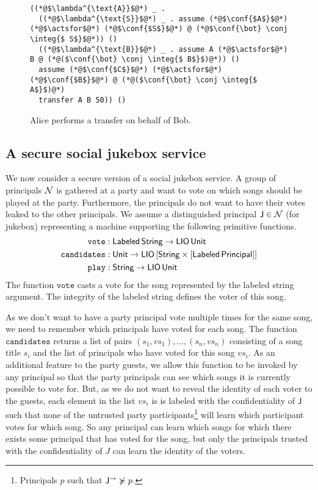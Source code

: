 \begin{figure}
\centering
\begin{lstlisting}
((*@$\lambda^{\text{A}}$@*) _ .
  ((*@$\lambda^{\text{S}}$@*) _ . assume (*@$\conf{$A$}$@*) (*@$\actsfor$@*) (*@$\conf{$S$}$@*) @ (*@$\conf{\bot} \conj \integ{$ S$}$@*)) ()
  ((*@$\lambda^{\text{B}}$@*) _ . assume A (*@$\actsfor$@*) B @ (*@($\conf{\bot} \conj \integ{$ B$}$)@*)) ()
  assume (*@$\conf{$C$}$@*) (*@$\actsfor$@*) (*@$\conf{$B$}$@*) @ (*@($\conf{\bot} \conj \integ{$ A$}$)@*)
  transfer A B 50)) ()
\end{lstlisting}
\caption{Alice performs a transfer on behalf of Bob.}
\label{fig:sec-bank-alice-banks-for-bob}
\end{figure}

\subsection{A secure social jukebox service}
We now consider a secure version of a social jukebox service. A group of principals $\mathcal{N}$ is gathered at a party and want to vote on which songs should be played at the party. Furthermore, the principals do not want to have their votes leaked to the other principals. We assume a distinguished principal $\mathsf{J} \in \mathcal{N}$ (for jukebox) representing a machine supporting the following primitive functions.
\begin{align*}
\mathtt{vote}&: \mathsf{Labeled}\,\mathsf{String} \to \mathsf{LIO}\,\mathsf{Unit}\\
\mathtt{candidates}&: \mathsf{Unit} \to \mathsf{LIO}\,\lbrack\mathsf{String} \times \lbrack\mathsf{Labeled}\,\mathsf{Principal}\rbrack\rbrack\\
\mathtt{play}&: \mathsf{String} \to \mathsf{LIO}\,\mathsf{Unit}
\end{align*}
The function $\mathtt{vote}$ casts a vote for the song represented by the labeled string argument. The integrity of the labeled string defines the voter of this song.

As we don't want to have a party principal vote multiple times for the same song, we need to remember which principals have voted for each song. The function $\mathtt{candidates}$ returns a list of pairs $(s_1, \mathit{vs}_1), \dots, (s_n, {\mathit{vs}}_n)$ consisting of a song title $s_i$ and the list of principals who have voted for this song $\mathit{vs}_i$. As an additional feature to the party guests, we allow this function to be invoked by any principal so that the party principals can see which songs it is currently possible to vote for. But, as we do not want to reveal the identity of each voter to the guests, each element in the list $\mathit{vs}_i$ is is labeled with the confidentiality of $\mathsf{J}$ such that none of the untrusted party participants\footnote{Principals $p$ such that $\mathsf{J}^{\rightarrow} \not\succcurlyeq p$.} will learn which participant votes for which song. So any principal can learn which songs for which there exists some principal that has voted for the song, but only the principals trusted with the confidentiality of $J$ can learn the identity of the voters.

